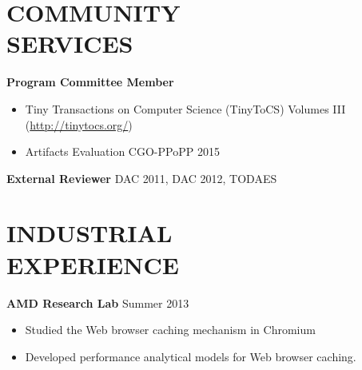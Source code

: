 \documentclass[margin, 9pt]{res} %
\begin{document}
\begin{resume}

\section{COMMUNITY\\ SERVICES}

\textbf{Program Committee Member}\\
\vspace*{-10pt}
\begin{itemize}[leftmargin=*] \itemsep -3pt
\vspace*{-5pt}
	\item Tiny Transactions on Computer Science (TinyToCS) Volumes III (\url{http://tinytocs.org/})\par
	\item Artifacts Evaluation CGO-PPoPP 2015\par
\end{itemize}
\textbf{External Reviewer} DAC 2011, DAC 2012, TODAES



\section{INDUSTRIAL\\ EXPERIENCE} 

{\textbf{AMD Research Lab}} \hfill{Summer 2013}\\
\vspace*{-10pt}
\begin{itemize}[leftmargin=*] \itemsep -3pt
\vspace*{-5pt}
	\item Studied the Web browser caching mechanism in Chromium
	\item Developed performance analytical models for Web browser caching.
\end{itemize}


\end{resume}
\end{document}
